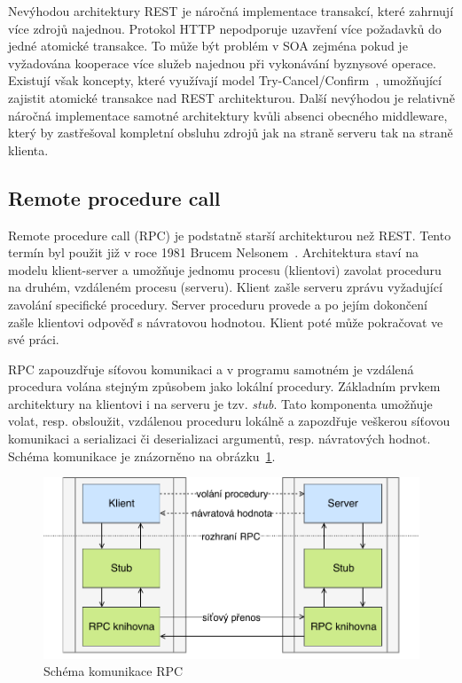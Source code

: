 Nevýhodou architektury \gls{REST} je náročná implementace transakcí, které zahrnují více
zdrojů najednou. Protokol \gls{HTTP} nepodporuje uzavření více požadavků do jedné atomické
transakce. To může být problém v \gls{SOA} zejména pokud je vyžadována kooperace více služeb
najednou při vykonávání byznysové operace. Existují však koncepty, které využívají model
Try-Cancel/Confirm~\cite{pardon2011towards}, umožňující zajistit atomické transakce nad
\gls{REST} architekturou. Další nevýhodou je relativně náročná implementace samotné architektury
kvůli absenci obecného middleware, který by zastřešoval kompletní obsluhu zdrojů jak na straně serveru tak
na straně klienta.

\subsection{Remote procedure call}\label{sec:rpc}

Remote procedure call (\gls{RPC}) je podstatně starší architekturou než \gls{REST}.
Tento termín byl použit již v roce 1981 Brucem Nelsonem~\cite{nelson1981remote}.
Architektura staví na modelu klient-server a umožňuje jednomu procesu (klientovi)
zavolat proceduru na druhém, vzdáleném procesu (serveru).
Klient zašle serveru zprávu vyžadující zavolání specifické procedury. Server
proceduru provede a po jejím dokončení zašle klientovi odpověď s návratovou hodnotou.
Klient poté může pokračovat ve své práci.

\gls{RPC} zapouzdřuje síťovou komunikaci a v programu samotném
je vzdálená procedura volána stejným způsobem jako lokální procedury. Základním
prvkem architektury na klientovi i na serveru je tzv. \textit{stub}. Tato komponenta
umožňuje volat, resp. obsloužit, vzdálenou proceduru lokálně a zapozdřuje veškerou
síťovou komunikaci a serializaci či deserializaci argumentů, resp. návratových hodnot.
Schéma komunikace je znázorněno na obrázku~\ref{fig:rpc}.

\begin{figure}[t]
    \centering
    \includegraphics[keepaspectratio=true, width=0.7\linewidth]{figures/rpc.pdf}
    \caption{Schéma komunikace \gls{RPC}}
    \label{fig:rpc}
\end{figure}

